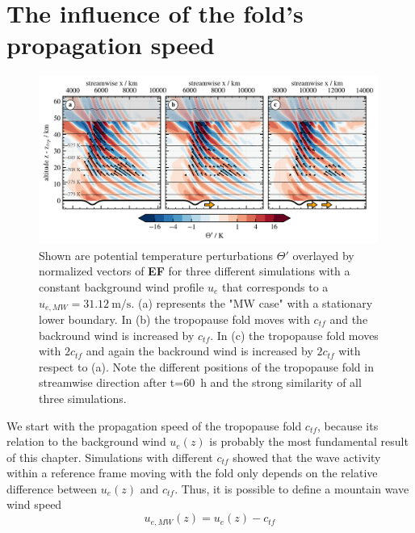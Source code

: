 \section{The influence of the fold's propagation speed}
\label{sec:q3D-speed}
\begin{figure}[tbp]
    \centering
    \includegraphics[width=0.99\textwidth]{figures_q3D/Q3D-TH-EF-ctropo.png}
    \caption{Shown are potential temperature perturbations $\Theta'$ overlayed by normalized vectors of \textbf{EF} for three different simulations with a constant background wind profile $u_e$ that corresponds to a $u_{e,MW}=\SI{31.12}{\meter\per\second}$. (a) represents the "MW case" with a stationary lower boundary. In (b) the tropopause fold moves with $c_{tf}$ and the backround wind is increased by $c_{tf}$. In (c) the tropopause fold moves with $2c_{tf}$ and again the backround wind is increased by $2c_{tf}$ with respect to (a). Note the different positions of the tropopause fold in streamwise direction after t=\SI{60}{\hour} and the strong similarity of all three simulations.}
    \label{fig:q3D_ctropo}
\end{figure}
We start with the propagation speed of the tropopause fold $c_{tf}$, because its relation to the background wind $u_e(z)$ is probably the most fundamental result of this chapter. Simulations with different $c_{tf}$ showed that the wave activity within a reference frame moving with the fold only depends on the relative difference between $u_e(z)$ and $c_{tf}$. Thus, it is possible to define a mountain wave wind speed
\begin{equation}
    u_{e,MW}(z) = u_e(z)-c_{tf}
    \label{equ:MW_forcing}
\end{equation}
